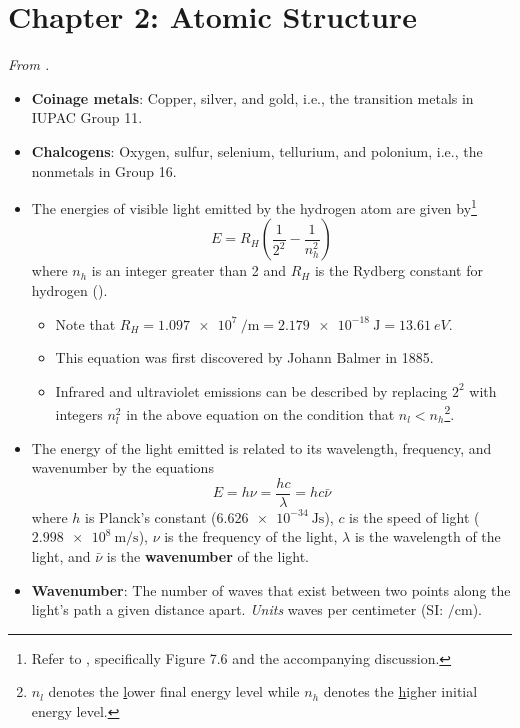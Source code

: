 \documentclass[../notes.tex]{subfiles}
\begin{document}
\section{Chapter 2: Atomic Structure}
\emph{From \textcite{bib:MiesslerFischerTarr}.}
\begin{itemize}
    \item {}\textbf{Coinage metals}: Copper, silver, and gold, i.e., the transition metals in IUPAC Group 11.
    \item \textbf{Chalcogens}: Oxygen, sulfur, selenium, tellurium, and polonium, i.e., the nonmetals in Group 16.
    \item The energies of visible light emitted by the hydrogen atom are given by\footnote{Refer to \textcite{bib:APChemNotes}, specifically Figure 7.6 and the accompanying discussion.}
    \begin{equation*}
        E = R_H\left( \frac{1}{2^2}-\frac{1}{n_h^2} \right)
    \end{equation*}
    where $n_h$ is an integer greater than 2 and $R_H$ is the Rydberg constant for hydrogen ().
    \begin{itemize}
        \item Note that $
            R_H = \SI{1.097e7}{\per\meter}
            = \SI{2.179e-18}{\joule}
            = \SI{13.61}{eV}
        $.
        \item This equation was first discovered by Johann Balmer in 1885.
        \item Infrared and ultraviolet emissions can be described by replacing $2^2$ with integers $n_l^2$ in the above equation on the condition that $n_l<n_h$\footnote{$n_l$ denotes the \underline{l}ower final energy level while $n_h$ denotes the \underline{h}igher initial energy level.}.
    \end{itemize}
    \item The energy of the light emitted is related to its wavelength, frequency, and wavenumber by the equations
    \begin{equation*}
        E = h\nu = \frac{hc}{\lambda} = hc\bar{\nu}
    \end{equation*}
    where $h$ is Planck's constant ($\SI{6.626e-34}{\joule\second}$), $c$ is the speed of light ($\SI{2.998e8}{\meter\per\second}$), $\nu$ is the frequency of the light, $\lambda$ is the wavelength of the light, and $\bar{\nu}$ is the \textbf{wavenumber} of the light.
    \item \textbf{Wavenumber}: The number of waves that exist between two points along the light's path a given distance apart. \emph{Units} waves per centimeter (SI: $\si{\per\centi\meter}$).

\end{itemize}
\end{document}
